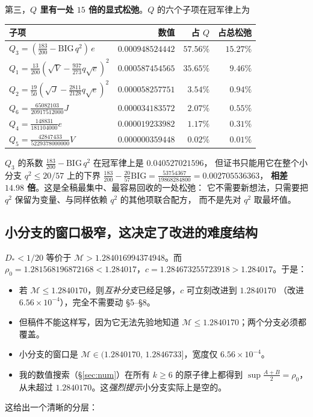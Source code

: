 \documentclass[UTF8,11pt]{ctexart}
\theoremstyle{definition}
\begin{document}
第三，\textbf{$Q$ 里有一处 $15$ 倍的显式松弛}。$Q$ 的六个子项在冠军律上为
\begin{center}
\small
\begin{tabular}{lrrr}
\toprule
子项 & 数值 & 占 $Q$ & 占总松弛\\
\midrule
$Q_3=(\frac{183}{200}-\mathrm{BIG}\,q^2)\,e$ & $0.000948524442$ & $57.56\%$ & $15.27\%$\\
$Q_1=\frac{13}{200}(\sqrt V-\frac{937}{273}q\sqrt e)^2$ & $0.000587454565$ & $35.65\%$ & $9.46\%$\\
$Q_2=\frac{19}{50}(\sqrt J-\frac{2811}{2128}q\sqrt e)^2$ & $0.000058257751$ & $3.54\%$ & $0.94\%$\\
$Q_6=\frac{65082103}{20917512000}J$ & $0.000034183572$ & $2.07\%$ & $0.55\%$\\
$Q_4=\frac{148831}{181104000}e$ & $0.000019233982$ & $1.17\%$ & $0.31\%$\\
$Q_5=\frac{42847433}{5229378000000}V$ & $0.000000359448$ & $0.02\%$ & $0.01\%$\\
\bottomrule
\end{tabular}
\end{center}
$Q_3$ 的系数 $\frac{183}{200}-\mathrm{BIG}\,q^2$ 在冠军律上是 $0.040527021596$，
但证书只能用它在整个小分支 $q^2\le20/57$ 上的下界
$\frac{183}{200}-\frac{20}{57}\mathrm{BIG}=\frac{53754367}{19868284800}=0.002705536363$，
\textbf{相差 $14.98$ 倍}。这是全稿最集中、最容易回收的一处松弛：
它不需要新想法，只需要把 $q^2$ 保留为变量、与同样依赖 $q^2$ 的其他项联合配方，
而不是先对 $q^2$ 取最坏值。

\subsection{小分支的窗口极窄，这决定了改进的难度结构}

$D_*<1/20$ 等价于 $\mathcal M>1.284016994374948$。而
$\rho_0=1.281568196872168<1.284017$，$c=1.284673255723918>1.284017$。于是：
\begin{itemize}[leftmargin=1.6em,itemsep=2pt]
\item 若 $\mathcal M\le1.2840170$，则\emph{互补分支}已经足够，$c$ 可立刻改进到 $1.2840170$
（改进 $6.56\times10^{-4}$），完全不需要动 \S5--\S8。
\item 但稿件不能这样写，因为它无法先验地知道 $\mathcal M\le1.2840170$；两个分支必须都覆盖。
\item 小分支的窗口是 $\mathcal M\in(1.2840170,\,1.2846733]$，宽度仅 $6.56\times10^{-4}$。
\item 我的数值搜索（\S\ref{sec:num}）在所有 $k\ge6$ 的原子律上都得到
$\sup\frac{A+B}2=\rho_0$，从未超过 $1.2840170$。这\emph{强烈提示}小分支实际上是空的。
\end{itemize}
\noindent 这给出一个清晰的分层：
\end{document}
